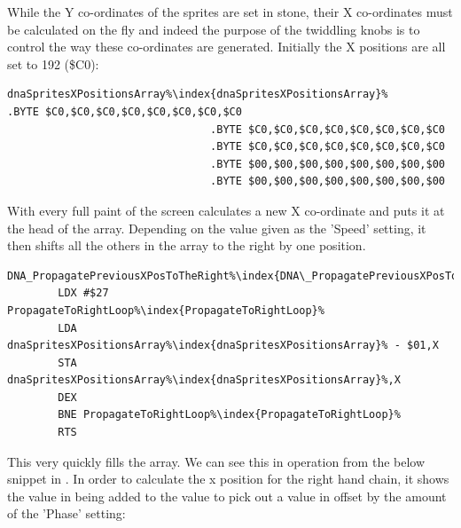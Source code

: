 While the Y co-ordinates of the sprites are set in stone, their X co-ordinates must be calculated on the fly
and indeed the purpose of the twiddling knobs is to control the way these co-ordinates are generated. Initially
the X positions are all set to 192 (\$C0):

\begin{lstlisting}[escapechar=\%]
dnaSpritesXPositionsArray%\index{dnaSpritesXPositionsArray}%       .BYTE $C0,$C0,$C0,$C0,$C0,$C0,$C0,$C0
                                .BYTE $C0,$C0,$C0,$C0,$C0,$C0,$C0,$C0
                                .BYTE $C0,$C0,$C0,$C0,$C0,$C0,$C0,$C0
                                .BYTE $00,$00,$00,$00,$00,$00,$00,$00
                                .BYTE $00,$00,$00,$00,$00,$00,$00,$00
\end{lstlisting}

With every full paint of the screen calculates a new X co-ordinate and puts it at the head of the array. Depending
on the value given as the 'Speed' setting, it then shifts all the others in the array to the right by one position. 

\begin{lstlisting}[escapechar=\%]
DNA_PropagatePreviousXPosToTheRight%\index{DNA\_PropagatePreviousXPosToTheRight}%
        LDX #$27
PropagateToRightLoop%\index{PropagateToRightLoop}%   
        LDA dnaSpritesXPositionsArray%\index{dnaSpritesXPositionsArray}% - $01,X
        STA dnaSpritesXPositionsArray%\index{dnaSpritesXPositionsArray}%,X
        DEX
        BNE PropagateToRightLoop%\index{PropagateToRightLoop}%
        RTS
\end{lstlisting}

This very quickly fills the array.  We can see this in operation from the below
snippet in . In order to calculate the x position
for the right hand chain, it shows the value in
 being added to the value
 to pick out a value in
 offset by the amount of the 'Phase' setting:


